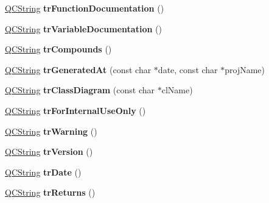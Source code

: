 \begin{DoxyCompactItemize}
\mbox{\hyperlink{class_q_c_string}{Q\+C\+String}} {\bfseries tr\+Function\+Documentation} ()
\item 
\mbox{\label{class_translator_slovene_a5073661e6c1e1a571c60e575cd9e1d8f}} 
\mbox{\hyperlink{class_q_c_string}{Q\+C\+String}} {\bfseries tr\+Variable\+Documentation} ()
\item 
\mbox{\label{class_translator_slovene_a6466027c10f6547d2c95a8bf69b0144c}} 
\mbox{\hyperlink{class_q_c_string}{Q\+C\+String}} {\bfseries tr\+Compounds} ()
\item 
\mbox{\label{class_translator_slovene_a70bb1ed5a0ef5271a46ab6169489213b}} 
\mbox{\hyperlink{class_q_c_string}{Q\+C\+String}} {\bfseries tr\+Generated\+At} (const char $\ast$date, const char $\ast$proj\+Name)
\item 
\mbox{\label{class_translator_slovene_aaa5bd668d850736e8cfd819af4a56a77}} 
\mbox{\hyperlink{class_q_c_string}{Q\+C\+String}} {\bfseries tr\+Class\+Diagram} (const char $\ast$cl\+Name)
\item 
\mbox{\label{class_translator_slovene_ae828a55f0d12ccd5208bbcb7c768a7a9}} 
\mbox{\hyperlink{class_q_c_string}{Q\+C\+String}} {\bfseries tr\+For\+Internal\+Use\+Only} ()
\item 
\mbox{\label{class_translator_slovene_a26bbf898a0befaefc224acd22388b331}} 
\mbox{\hyperlink{class_q_c_string}{Q\+C\+String}} {\bfseries tr\+Warning} ()
\item 
\mbox{\label{class_translator_slovene_af7b47ae056d1b7f8f3dc640822e4466a}} 
\mbox{\hyperlink{class_q_c_string}{Q\+C\+String}} {\bfseries tr\+Version} ()
\item 
\mbox{\label{class_translator_slovene_afc394a607cbd0961a358c25c9cd53d27}} 
\mbox{\hyperlink{class_q_c_string}{Q\+C\+String}} {\bfseries tr\+Date} ()
\item 
\mbox{\label{class_translator_slovene_af55884fe67dca8796b5ce6d73558c844}} 
\mbox{\hyperlink{class_q_c_string}{Q\+C\+String}} {\bfseries tr\+Returns} ()

\end{DoxyCompactItemize}
